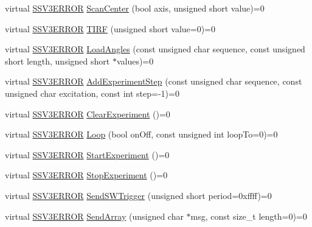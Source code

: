 \begin{DoxyCompactItemize}
\item 
virtual \hyperlink{classSSV3_1_1Controller_a8ff24a92ec373aa1257dcfe2aa2e5406}{S\+S\+V3\+E\+R\+R\+OR} \hyperlink{classSSV3_1_1Controller_adc4a8e3358176f977dfb37e1cb5bce86}{Scan\+Center} (bool axis, unsigned short value)=0
\item 
virtual \hyperlink{classSSV3_1_1Controller_a8ff24a92ec373aa1257dcfe2aa2e5406}{S\+S\+V3\+E\+R\+R\+OR} \hyperlink{classSSV3_1_1Controller_a3536d65f5a029b2794c8ebb50554c1f7}{T\+I\+RF} (unsigned short value=0)=0
\item 
virtual \hyperlink{classSSV3_1_1Controller_a8ff24a92ec373aa1257dcfe2aa2e5406}{S\+S\+V3\+E\+R\+R\+OR} \hyperlink{classSSV3_1_1Controller_a0717132af0002b8a4d1b21e591de1ca1}{Load\+Angles} (const unsigned char sequence, const unsigned short length, unsigned short $\ast$values)=0
\item 
virtual \hyperlink{classSSV3_1_1Controller_a8ff24a92ec373aa1257dcfe2aa2e5406}{S\+S\+V3\+E\+R\+R\+OR} \hyperlink{classSSV3_1_1Controller_af85ec395eb6d84916bb855088e294e06}{Add\+Experiment\+Step} (const unsigned char sequence, const unsigned char excitation, const int step=-\/1)=0
\item 
virtual \hyperlink{classSSV3_1_1Controller_a8ff24a92ec373aa1257dcfe2aa2e5406}{S\+S\+V3\+E\+R\+R\+OR} \hyperlink{classSSV3_1_1Controller_aa64e9f3148bfde53ac0d7169e308a696}{Clear\+Experiment} ()=0
\item 
virtual \hyperlink{classSSV3_1_1Controller_a8ff24a92ec373aa1257dcfe2aa2e5406}{S\+S\+V3\+E\+R\+R\+OR} \hyperlink{classSSV3_1_1Controller_aaeab781100d4fab7f921d1fbc22ea8e1}{Loop} (bool on\+Off, const unsigned int loop\+To=0)=0
\item 
virtual \hyperlink{classSSV3_1_1Controller_a8ff24a92ec373aa1257dcfe2aa2e5406}{S\+S\+V3\+E\+R\+R\+OR} \hyperlink{classSSV3_1_1Controller_a502e4fbb762a16a860b89836b3c1b402}{Start\+Experiment} ()=0
\item 
virtual \hyperlink{classSSV3_1_1Controller_a8ff24a92ec373aa1257dcfe2aa2e5406}{S\+S\+V3\+E\+R\+R\+OR} \hyperlink{classSSV3_1_1Controller_a418c6f3bee822914f68a4e4a75470aa3}{Stop\+Experiment} ()=0
\item 
virtual \hyperlink{classSSV3_1_1Controller_a8ff24a92ec373aa1257dcfe2aa2e5406}{S\+S\+V3\+E\+R\+R\+OR} \hyperlink{classSSV3_1_1Controller_a9e0bb5a0a1b4ebbf29ffdb21dc81f1b2}{Send\+S\+W\+Trigger} (unsigned short period=0xffff)=0
\item 
virtual \hyperlink{classSSV3_1_1Controller_a8ff24a92ec373aa1257dcfe2aa2e5406}{S\+S\+V3\+E\+R\+R\+OR} \hyperlink{classSSV3_1_1Controller_a421c2b50d9fe3bc93f8ec7e900a9d79a}{Send\+Array} (unsigned char $\ast$msg, const size\+\_\+t length=0)=0

\end{DoxyCompactItemize}
